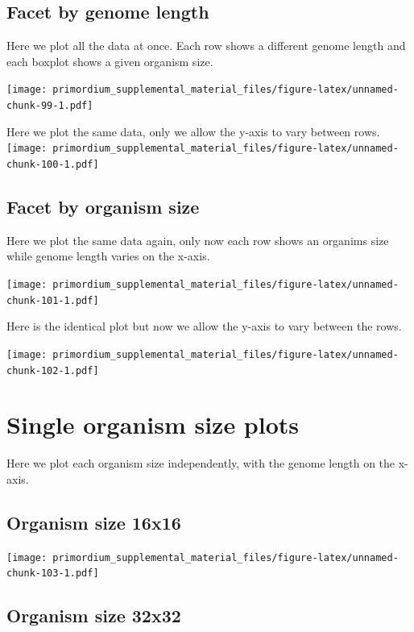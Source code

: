 \documentclass[]{book}
\begin{document}
\hypertarget{facet-by-genome-length-1}{%
\subsection{Facet by genome length}\label{facet-by-genome-length-1}}

Here we plot all the data at once.
Each row shows a different genome length and each boxplot shows a given organism size.

\texttt{[image: primordium\_supplemental\_material\_files/figure-latex/unnamed-chunk-99-1.pdf]}

Here we plot the same data, only we allow the y-axis to vary between rows.
\texttt{[image: primordium\_supplemental\_material\_files/figure-latex/unnamed-chunk-100-1.pdf]}

\hypertarget{facet-by-organism-size-3}{%
\subsection{Facet by organism size}\label{facet-by-organism-size-3}}

Here we plot the same data again, only now each row shows an organims size while genome length varies on the x-axis.

\texttt{[image: primordium\_supplemental\_material\_files/figure-latex/unnamed-chunk-101-1.pdf]}

Here is the identical plot but now we allow the y-axis to vary between the rows.

\texttt{[image: primordium\_supplemental\_material\_files/figure-latex/unnamed-chunk-102-1.pdf]}

\hypertarget{single-organism-size-plots-4}{%
\section{Single organism size plots}\label{single-organism-size-plots-4}}

Here we plot each organism size independently, with the genome length on the x-axis.

\hypertarget{organism-size-16x16-3}{%
\subsection{Organism size 16x16}\label{organism-size-16x16-3}}

\texttt{[image: primordium\_supplemental\_material\_files/figure-latex/unnamed-chunk-103-1.pdf]}

\hypertarget{organism-size-32x32-3}{%
\subsection{Organism size 32x32}\label{organism-size-32x32-3}}
\end{document}
